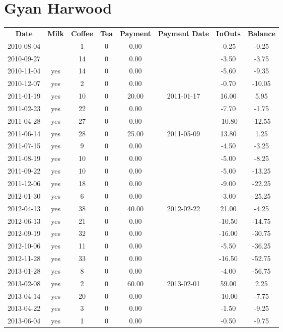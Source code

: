 \section{Gyan Harwood}

\begin{center}
\begin{tabular}{cccccccc}
\textbf{Date} & \textbf{Milk} & \textbf{Coffee} & \textbf{Tea} & \textbf{Payment} & \textbf{Payment Date} & \textbf{InOuts} & \textbf{Balance} \\
2010-08-04 &  &  1 & 0 &  0.00 &  &  -0.25 &  -0.25\\ 
2010-09-27 &  & 14 & 0 &  0.00 &  &  -3.50 &  -3.75\\ 
2010-11-04 & yes & 14 & 0 &  0.00 &  &  -5.60 &  -9.35\\ 
2010-12-07 & yes &  2 & 0 &  0.00 &  &  -0.70 & -10.05\\ 
2011-01-19 & yes & 10 & 0 & 20.00 & 2011-01-17 &  16.00 &   5.95\\ 
2011-02-23 & yes & 22 & 0 &  0.00 &  &  -7.70 &  -1.75\\ 
2011-04-28 & yes & 27 & 0 &  0.00 &  & -10.80 & -12.55\\ 
2011-06-14 & yes & 28 & 0 & 25.00 & 2011-05-09 &  13.80 &   1.25\\ 
2011-07-15 & yes &  9 & 0 &  0.00 &  &  -4.50 &  -3.25\\ 
2011-08-19 & yes & 10 & 0 &  0.00 &  &  -5.00 &  -8.25\\ 
2011-09-22 & yes & 10 & 0 &  0.00 &  &  -5.00 & -13.25\\ 
2011-12-06 & yes & 18 & 0 &  0.00 &  &  -9.00 & -22.25\\ 
2012-01-30 & yes &  6 & 0 &  0.00 &  &  -3.00 & -25.25\\ 
2012-04-13 & yes & 38 & 0 & 40.00 & 2012-02-22 &  21.00 &  -4.25\\ 
2012-06-13 & yes & 21 & 0 &  0.00 &  & -10.50 & -14.75\\ 
2012-09-19 & yes & 32 & 0 &  0.00 &  & -16.00 & -30.75\\ 
2012-10-06 & yes & 11 & 0 &  0.00 &  &  -5.50 & -36.25\\ 
2012-11-28 & yes & 33 & 0 &  0.00 &  & -16.50 & -52.75\\ 
2013-01-28 & yes &  8 & 0 &  0.00 &  &  -4.00 & -56.75\\ 
2013-02-08 & yes &  2 & 0 & 60.00 & 2013-02-01 &  59.00 &   2.25\\ 
2013-04-14 & yes & 20 & 0 &  0.00 &  & -10.00 &  -7.75\\ 
2013-04-22 & yes &  3 & 0 &  0.00 &  &  -1.50 &  -9.25\\ 
2013-06-04 & yes &  1 & 0 &  0.00 &  &  -0.50 &  -9.75
\end{tabular}
\end{center}

